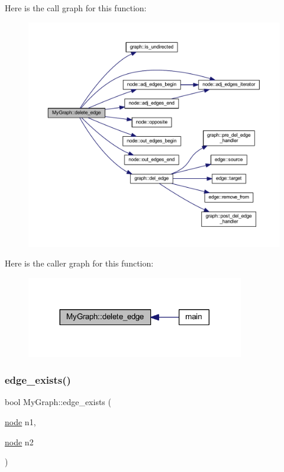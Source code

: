Here is the call graph for this function\+:\nopagebreak
\begin{figure}[H]
\begin{center}
\leavevmode
\includegraphics[width=350pt]{class_my_graph_a4070383c56ef8f54e9fdc595d65b89de_cgraph}
\end{center}
\end{figure}
Here is the caller graph for this function\+:\nopagebreak
\begin{figure}[H]
\begin{center}
\leavevmode
\includegraphics[width=269pt]{class_my_graph_a4070383c56ef8f54e9fdc595d65b89de_icgraph}
\end{center}
\end{figure}
\mbox{\label{class_my_graph_a67910a9535e93bc6dcf53e961760b6da}} 
\subsubsection{\texorpdfstring{edge\+\_\+exists()}{edge\_exists()}}
{\footnotesize\ttfamily bool My\+Graph\+::edge\+\_\+exists (\begin{DoxyParamCaption}\item[{\mbox{\hyperlink{classnode}{node}}}]{n1,  }\item[{\mbox{\hyperlink{classnode}{node}}}]{n2 }\end{DoxyParamCaption})\hspace{0.3cm}{\ttfamily [virtual]}}

